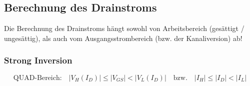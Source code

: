 


    








\subsection{Berechnung des Drainstroms}

Die Berechnung des Drainstroms hängt sowohl von Arbeitsbereich (gesättigt / ungesättig), als auch vom Ausgangsstrombereich (bzw. der Kanaliversion) ab!


\subsubsection{Strong Inversion}

\vspace{-0.3cm}

$$ \boxed{ \text{QUAD-Bereich:} \quad |V_H(I_D)| \leq |V_{GS}| < |V_L(I_D)| \quad \text{bzw.} \quad |I_H| \leq |I_D| < |I_L| } $$  %

